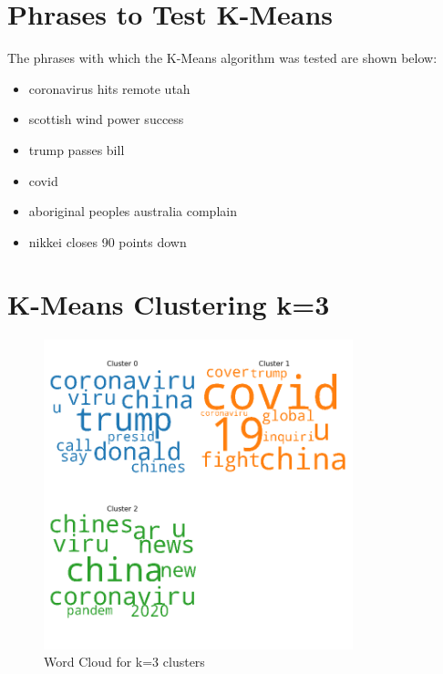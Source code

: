 \appendix



\begin{appendices}
	\section{Phrases to Test K-Means}
	The phrases with which the K-Means algorithm was tested are shown below:
	\label{phrases}
\renewcommand\labelitemi{---}
	\begin{itemize}
\item 			 coronavirus hits remote utah
		\item scottish wind power success 
\item 		trump passes bill
		\item covid
		\item aboriginal peoples australia complain
		\item nikkei closes 90 points down
	\end{itemize}

	\section{K-Means Clustering k=3}
	\label{k3}
	\begin{figure}[H]
		\centering
		\includegraphics[width=0.8\textwidth]{images/kmeans_word_cloud_k=3.png}
		\caption{Word Cloud for k=3 clusters}
		\label{fig:wck3}
	\end{figure}
	

\end{appendices}
